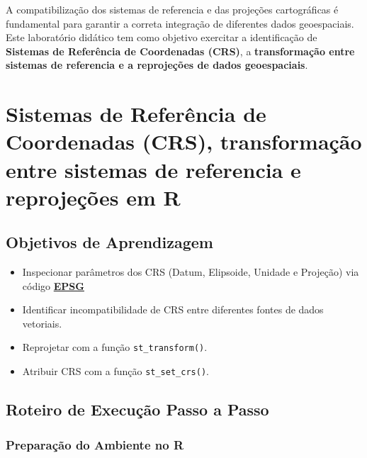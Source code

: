 \documentclass[
  letterpaper,
  DIV=11,
  numbers=noendperiod]{scrreprt}
\begin{document}
A compatibilização dos sistemas de referencia e das projeções
cartográficas é fundamental para garantir a correta integração de
diferentes dados geoespaciais. Este laboratório didático tem como
objetivo exercitar a identificação de \textbf{Sistemas de Referência de
Coordenadas (CRS)}, a \textbf{transformação entre sistemas de referencia
e a reprojeções de dados geoespaciais}.

\section{\texorpdfstring{\textbf{Sistemas de Referência de Coordenadas
(CRS), transformação entre sistemas de referencia e reprojeções em
R}}{Sistemas de Referência de Coordenadas (CRS), transformação entre sistemas de referencia e reprojeções em R}}\label{sistemas-de-referuxeancia-de-coordenadas-crs-transformauxe7uxe3o-entre-sistemas-de-referencia-e-reprojeuxe7uxf5es-em-r}

\subsection{\texorpdfstring{\textbf{Objetivos de
Aprendizagem}}{Objetivos de Aprendizagem}}\label{objetivos-de-aprendizagem}

\begin{itemize}
\item
  Inspecionar parâmetros dos CRS (Datum, Elipsoide, Unidade e Projeção)
  via código \href{https://epsg.io/}{\textbf{EPSG}}
\item
  Identificar incompatibilidade de CRS entre diferentes fontes de dados
  vetoriais.
\item
  Reprojetar com a função \texttt{st\_transform()}.
\item
  Atribuir CRS com a função \texttt{st\_set\_crs()}.
\end{itemize}

\subsection{\texorpdfstring{\textbf{Roteiro de Execução Passo a
Passo}}{Roteiro de Execução Passo a Passo}}\label{roteiro-de-execuuxe7uxe3o-passo-a-passo}

\subsubsection{\texorpdfstring{\textbf{Preparação do Ambiente no
R}}{Preparação do Ambiente no R}}\label{preparauxe7uxe3o-do-ambiente-no-r}
\end{document}
